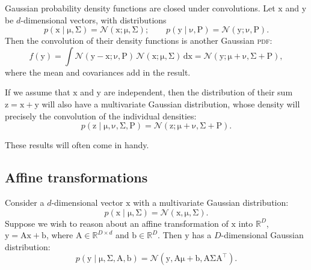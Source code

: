 \documentclass{article}
\newcommand{\acro}[1]{\textsc{\MakeLowercase{#1}}}
\newcommand{\given}{\mid}
\newcommand{\mc}[1]{\mathcal{#1}}
\newcommand{\intd}[1]{\,\mathrm{d}{#1}}
\newcommand{\trans}{^\top}
\newcommand{\mat}[1]{\bm{\mathrm{#1}}}
\renewcommand{\vec}[1]{\bm{\mathrm{#1}}}
\newcommand{\R}{\mathbb{R}}
\begin{document}
Gaussian probability density functions are closed under convolutions.
Let $\vec{x}$ and $\vec{y}$ be $d$-dimensional vectors, with
distributions
\begin{equation*}
  p(\vec{x} \given \vec{\mu}, \mat{\Sigma})
  =
  \mc{N}(\vec{x}; \vec{\mu}, \mat{\Sigma});
  \qquad
  p(\vec{y} \given \vec{\nu}, \mat{P})
  =
  \mc{N}(\vec{y}; \vec{\nu}, \mat{P}).
\end{equation*}
Then the convolution of their density functions is another Gaussian
\acro{PDF}:
\begin{equation*}
  f(\vec{y}) =
  \int
  \mc{N}(\vec{y} - \vec{x}; \vec{\nu}, \mat{P})
  \,
  \mc{N}(\vec{x}; \vec{\mu}, \mat{\Sigma})
  \intd{\vec{x}}
  =
  \mc{N}(\vec{y}; \vec{\mu} + \vec{\nu}, \mat{\Sigma} + \mat{P}),
\end{equation*}
where the mean and covariances add in the result.

If we assume that $\vec{x}$ and $\vec{y}$ are independent, then the
distribution of their sum $\vec{z} = \vec{x} + \vec{y}$ will also have
a multivariate Gaussian distribution, whose density will precisely the
convolution of the individual densities:
\begin{equation*}
  p(\vec{z} \given \vec{\mu}, \vec{\nu}, \mat{\Sigma}, \mat{P})
  =
  \mc{N}(\vec{z}; \vec{\mu} + \vec{\nu}, \mat{\Sigma} + \mat{P}).
\end{equation*}

These results will often come in handy.

\subsection*{Affine transformations}

Consider a $d$-dimensional vector $\vec{x}$ with a multivariate
Gaussian distribution:
\begin{equation*}
  p(\vec{x} \given \vec{\mu}, \mat{\Sigma})
  =
  \mc{N}(\vec{x}, \vec{\mu}, \mat{\Sigma}).
\end{equation*}
Suppose we wish to reason about an affine transformation of $\vec{x}$
into $\R^D$, $\vec{y} = \mat{A}\vec{x} + \vec{b}$, where $\mat{A} \in
\R^{D \times d}$ and $\vec{b} \in \R^D$.  Then $\vec{y}$ has a
$D$-dimensional Gaussian distribution:
\begin{equation*}
  p(\vec{y} \given \vec{\mu}, \mat{\Sigma}, \mat{A}, \vec{b})
  =
  \mc{N}(\vec{y}, \mat{A}\vec{\mu} + \vec{b}, \mat{A}\mat{\Sigma}\mat{A}\trans).
\end{equation*}
\end{document}
